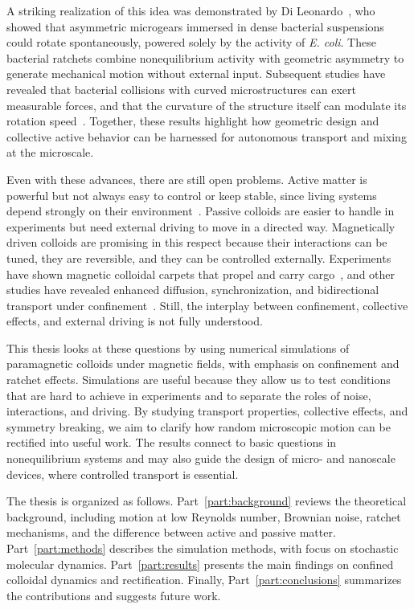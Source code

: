 A striking realization of this idea was demonstrated by Di Leonardo~\cite{di2010bacterial}, who showed that asymmetric microgears immersed in dense bacterial suspensions could rotate spontaneously, powered solely by the activity of \textit{E. coli}. These bacterial ratchets combine nonequilibrium activity with geometric asymmetry to generate mechanical motion without external input. Subsequent studies have revealed that bacterial collisions with curved microstructures can exert measurable forces, and that the curvature of the structure itself can modulate its rotation speed~\cite{pellicciotta2025wall}. Together, these results highlight how geometric design and collective active behavior can be harnessed for autonomous transport and mixing at the microscale.

Even with these advances, there are still open problems. Active matter is powerful but not always easy to control or keep stable, since living systems depend strongly on their environment~\cite{bechinger2016active}. Passive colloids are easier to handle in experiments but need external driving to move in a directed way. Magnetically driven colloids are promising in this respect because their interactions can be tuned, they are reversible, and they can be controlled externally. Experiments have shown magnetic colloidal carpets that propel and carry cargo~\cite{martinez2015magnetic}, and other studies have revealed enhanced diffusion, synchronization, and bidirectional transport under confinement~\cite{tierno2012depinning, straube2014tunable, massana2020emergent, ostinato2024magnetically}. Still, the interplay between confinement, collective effects, and external driving is not fully understood.

This thesis looks at these questions by using numerical simulations of paramagnetic colloids under magnetic fields, with emphasis on confinement and ratchet effects. Simulations are useful because they allow us to test conditions that are hard to achieve in experiments and to separate the roles of noise, interactions, and driving. By studying transport properties, collective effects, and symmetry breaking, we aim to clarify how random microscopic motion can be rectified into useful work. The results connect to basic questions in nonequilibrium systems and may also guide the design of micro- and nanoscale devices, where controlled transport is essential.

The thesis is organized as follows. Part~\ref{part:background} reviews the theoretical background, including motion at low Reynolds number, Brownian noise, ratchet mechanisms, and the difference between active and passive matter. Part~\ref{part:methods} describes the simulation methods, with focus on stochastic molecular dynamics. Part~\ref{part:results} presents the main findings on confined colloidal dynamics and rectification. Finally, Part~\ref{part:conclusions} summarizes the contributions and suggests future work.
